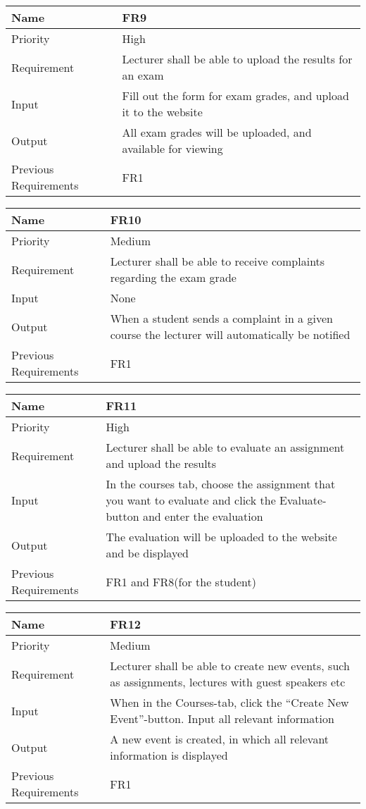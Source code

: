 \begin{tabularx}{\textwidth}{|l|X|}
  \hline
  Name & FR9 \\ \hline
  Priority & High \\ \hline
  Requirement & Lecturer shall be able to upload the results for an exam \\ \hline
  Input & Fill out the form for exam grades, and upload it to the website \\ \hline
  Output & All exam grades will be uploaded, and available for viewing \\ \hline
  Previous Requirements & FR1 \\ \hline
\end{tabularx}

\begin{tabularx}{\textwidth}{|l|X|}
  \hline
  Name & FR10 \\ \hline
  Priority & Medium \\ \hline
  Requirement & Lecturer shall be able to receive complaints regarding the exam grade \\ \hline
  Input & None \\ \hline
  Output & When a student sends a complaint in a given course the lecturer will automatically be notified \\ \hline
  Previous Requirements & FR1 \\ \hline
\end{tabularx}

\begin{tabularx}{\textwidth}{|l|X|}
  \hline
  Name & FR11 \\ \hline
  Priority & High \\ \hline
  Requirement & Lecturer shall be able to evaluate an assignment and upload the results \\ \hline
  Input & In the courses tab, choose the assignment that you want to evaluate and click the Evaluate-button and enter the evaluation \\ \hline
  Output & The evaluation will be uploaded to the website and be displayed \\ \hline
  Previous Requirements & FR1 and FR8(for the student) \\ \hline
\end{tabularx}

\begin{tabularx}{\textwidth}{|l|X|}
  \hline
  Name & FR12 \\ \hline
  Priority & Medium \\ \hline
  Requirement & Lecturer shall be able to create new events, such as assignments, lectures with guest speakers etc \\ \hline
  Input & When in the Courses-tab, click the “Create New Event”-button. Input all relevant information \\ \hline
  Output & A new event is created, in which all relevant information is displayed \\ \hline
  Previous Requirements & FR1 \\ \hline
\end{tabularx}

